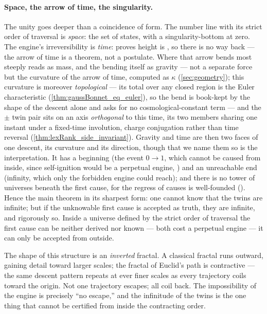 \paragraph{Space, the arrow of time, the singularity.}
The unity goes deeper than a coincidence of form. The number line with its strict order of
traversal is \emph{space}: the set of states, with a singularity-bottom at zero. The engine's
irreversibility is \emph{time}:  proves height is , so
there is no way back --- the arrow of time is a theorem, not a postulate. Where that arrow bends most steeply reads as mass,
and the bending itself as gravity --- not a separate force but the curvature of the arrow of time,
computed as $\kappa$ (\cref{sec:geometry}); this curvature is moreover \emph{topological} --- its total
over any closed region is the Euler characteristic (\cref{thm:gaussBonnet_eq_euler}), so the bend is
book-kept by the shape of the descent alone and asks for no cosmological-constant term --- and the
$\pm$ twin pair sits on an axis \emph{orthogonal} to this time, its two members sharing one instant
under a fixed-time involution, charge conjugation rather than time reversal
(\cref{thm:lexRank_side_invariant}). Gravity and time are then two faces of one descent, its
curvature and its direction, though that we name them so is the interpretation. It has a beginning (the
event $0 \to 1$, which cannot be caused from inside, since self-ignition would be a perpetual
engine, ) and an unreachable end (infinity, which only the
forbidden engine could reach); and there is no tower of universes beneath the first cause, for the
regress of causes is well-founded (). Hence the main theorem in
its sharpest form: one cannot know that the twins are infinite; but if the unknowable first cause is
accepted as truth, they are infinite, and rigorously so. Inside a universe defined by the strict
order of traversal the first cause can be neither derived nor known --- both cost a perpetual engine
--- it can only be accepted from outside.

The shape of this structure is an \emph{inverted} fractal. A classical fractal runs outward, gaining
detail toward larger scales; the fractal of Euclid's path is contractive --- the same descent
pattern repeats at ever finer scales as every trajectory coils toward the origin. Not one trajectory
escapes; all coil back. The impossibility of the engine is precisely ``no escape,'' and the
infinitude of the twins is the one thing that cannot be certified from inside the contracting order.

